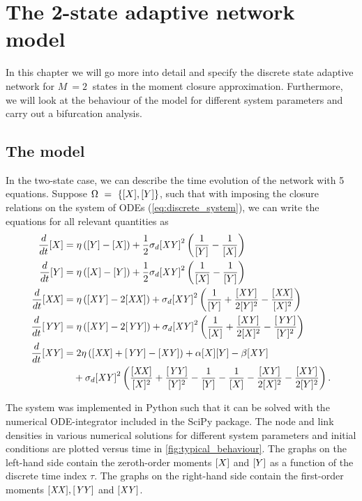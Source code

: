 \chapter{The 2-state adaptive network model}
In this chapter we will go more into detail and specify the discrete state adaptive network for $M~=2~$ states in the moment closure approximation. Furthermore, we will look at the behaviour of the model for different system parameters and carry out a bifurcation analysis.
\section{The model}
 In the two-state case, we can describe the time evolution of the network with 5 equations. Suppose $\Omega~=~\{ [X],[Y] \} $, such that with imposing the closure relations on the system of ODEs (\ref{eq:discrete_system}), we can write the equations for all relevant quantities as 
\begin{subequations}\label{eq:M2system_closure_written_out}
\begin{align}
\frac{d}{dt}[X] &= \eta \left([Y]-[X]\right) + \frac{1}{2} \sigma_d \mathit{[XY]}^2 \left( \frac{1}{[Y]} - \frac{1}{[X]} \right) \\
\frac{d}{dt}[Y] &= \eta \left([X]-[Y]\right) + \frac{1}{2} \sigma_d \mathit{[XY]}^2 \left( \frac{1}{[X]} - \frac{1}{[Y]} \right) \\
\frac{d}{dt}\mathit{[XX]} &= \eta \left(\mathit{[XY]} -2\mathit{[XX]} \right) + \sigma_d \mathit{[XY]}^2 \left( \frac{1}{[Y]} + \frac{\mathit{[XY]}}{2[Y]^2} - \frac{\mathit{[XX]}}{[X]^2} \right) \\
\frac{d}{dt}\mathit{[YY]} &= \eta \left(\mathit{[XY]} -2\mathit{[YY]} \right) + \sigma_d \mathit{[XY]}^2 \left( \frac{1}{[X]} + \frac{\mathit{[XY]}}{2[X]^2} - \frac{\mathit{[YY]}}{[Y]^2} \right) \\
\frac{d}{dt}\mathit{[XY]} &= 2\eta \left( \mathit{[XX]} + \mathit{[YY]} -\mathit{[XY]} \right) + \alpha [X][Y] - \beta \mathit{[XY]} \\ 
&\quad + \sigma_d \mathit{[XY]}^2  \left( \frac{\mathit{[XX]}}{[X]^2} + \frac{\mathit{[YY]}}{[Y]^2} - \frac{1}{[Y]} - \frac{1}{[X]} - \frac{\mathit{[XY]}}{2[X]^2} - \frac{\mathit{[XY]}}{2[Y]^2} \right). \nonumber
\end{align}
\end{subequations}

The system was implemented in Python such that it can be solved with the  numerical ODE-integrator included in the SciPy package. 
The node and link densities in various numerical solutions for different system parameters and initial conditions are plotted versus time in \cref{fig:typical_behaviour}. The graphs on the left-hand side contain the zeroth-order moments $[X]$ and $[Y]$ as a function of the discrete time index $\tau$. The graphs on the right-hand side contain the first-order moments $\mathit{[XX]}, \mathit{[YY]}$ and $\mathit{[XY]}$. 

